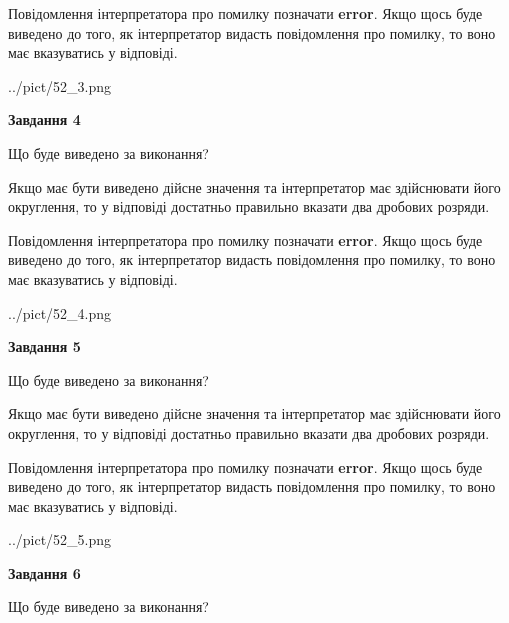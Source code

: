 \documentclass[12pt, ukrainian]{article}
\begin{document}
{\begin {Large}
Повідомлення інтерпретатора про помилку позначати \textbf{error}.
Якщо щось буде виведено до того, як інтерпретатор видасть повідомлення про помилку, 
то воно має вказуватись у відповіді. \par

\begin{center}
	{../pict/52_3.png}
\end{center}
\newpage

{\begin {center}\textbf{Завдання 4}\end {center}}\par
Що буде виведено за виконання? \par

Якщо має бути виведено дійсне значення та інтерпретатор має здійснювати його округлення, 
то у відповіді достатньо правильно вказати два дробових розряди.

Повідомлення інтерпретатора про помилку позначати \textbf{error}.
Якщо щось буде виведено до того, як інтерпретатор видасть повідомлення про помилку, 
то воно має вказуватись у відповіді. \par

\begin{center}
	{../pict/52_4.png}
\end{center}
\newpage

{\begin {center}\textbf{Завдання 5}\end {center}}\par
Що буде виведено за виконання? \par

Якщо має бути виведено дійсне значення та інтерпретатор має здійснювати його округлення, 
то у відповіді достатньо правильно вказати два дробових розряди.

Повідомлення інтерпретатора про помилку позначати \textbf{error}.
Якщо щось буде виведено до того, як інтерпретатор видасть повідомлення про помилку, 
то воно має вказуватись у відповіді. \par

\begin{center}
	{../pict/52_5.png}
\end{center}
\newpage

{\begin {center}\textbf{Завдання 6}\end {center}}\par
Що буде виведено за виконання? \par


\end{Large}}
\end{document}
